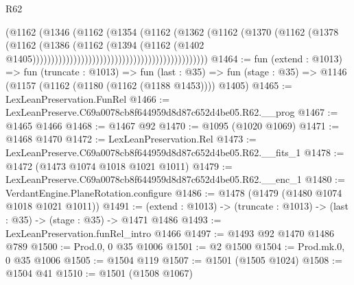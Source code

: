 \begin{lexlean}{R62}
\begin{coremodule}
                                                                  (@1162
                                                                    (@1346
                                                                      (@1162
                                                                        (@1354
                                                                          (@1162
                                                                            (@1362
                                                                              (@1162
                                                                                (@1370
                                                                                  (@1162
                                                                                    (@1378
                                                                                      (@1162
                                                                                        (@1386
                                                                                          (@1162
                                                                                            (@1394
                                                                                              (@1162
                                                                                                (@1402
                                                                                                  @1405)))))))))))))))))))))))))))))))))))))))))))))))
@1464 := fun (extend : @1013) =>
  fun (truncate : @1013) =>
  fun (last : @35) => fun (stage : @35) => @1146 (@1157 (@1162 (@1180 (@1162 (@1188 @1453)))) @1405)
@1465 := LexLeanPreservation.FunRel
@1466 := LexLeanPreserve.C69a0078cb8f644959d8d87c652d4be05.R62.__prog
@1467 := @1465 @1466
@1468 := @1467 @92
@1470 := @1095 (@1020 @1069)
@1471 := @1468 @1470
@1472 := LexLeanPreservation.Rel
@1473 := LexLeanPreserve.C69a0078cb8f644959d8d87c652d4be05.R62.__fits_1
@1478 := @1472 (@1473 @1074 @1018 @1021 @1011)
@1479 := LexLeanPreserve.C69a0078cb8f644959d8d87c652d4be05.R62.__enc_1
@1480 := VerdantEngine.PlaneRotation.configure
@1486 := @1478 (@1479 (@1480 @1074 @1018 @1021 @1011))
@1491 := (extend : @1013) -> (truncate : @1013) -> (last : @35) -> (stage : @35) -> @1471 @1486
@1493 := LexLeanPreservation.funRel_intro @1466
@1497 := @1493 @92 @1470 @1486 @789
@1500 := Prod.{0, 0} @35 @1006
@1501 := @2 @1500
@1504 := Prod.mk.{0, 0} @35 @1006
@1505 := @1504 @119
@1507 := @1501 (@1505 @1024)
@1508 := @1504 @41
@1510 := @1501 (@1508 @1067)

\end{coremodule}
\end{lexlean}

